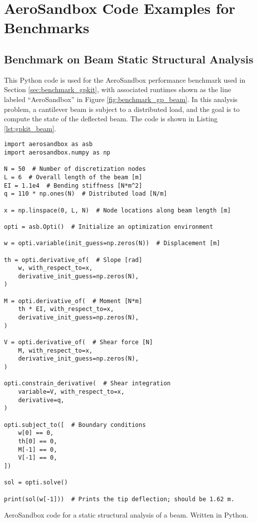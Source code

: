\chapter{AeroSandbox Code Examples for Benchmarks}
\label{chap:code}


\section{Benchmark on Beam Static Structural Analysis}

This Python code is used for the AeroSandbox performance benchmark used in Section \ref{sec:benchmark_gpkit}, with associated runtimes shown as the line labeled ``AeroSandbox'' in Figure \ref{fig:benchmark_gp_beam}. In this analysis problem, a cantilever beam is subject to a distributed load, and the goal is to compute the state of the deflected beam. The code is shown in Listing \ref{lst:gpkit_beam}.

\begin{listing}[h]
    \begin{verbatim}
import aerosandbox as asb
import aerosandbox.numpy as np

N = 50  # Number of discretization nodes
L = 6  # Overall length of the beam [m]
EI = 1.1e4  # Bending stiffness [N*m^2]
q = 110 * np.ones(N)  # Distributed load [N/m]

x = np.linspace(0, L, N)  # Node locations along beam length [m]

opti = asb.Opti()  # Initialize an optimization environment

w = opti.variable(init_guess=np.zeros(N))  # Displacement [m]

th = opti.derivative_of(  # Slope [rad]
    w, with_respect_to=x,
    derivative_init_guess=np.zeros(N),
)

M = opti.derivative_of(  # Moment [N*m]
    th * EI, with_respect_to=x,
    derivative_init_guess=np.zeros(N),
)

V = opti.derivative_of(  # Shear force [N]
    M, with_respect_to=x,
    derivative_init_guess=np.zeros(N),
)

opti.constrain_derivative(  # Shear integration
    variable=V, with_respect_to=x,
    derivative=q,
)

opti.subject_to([  # Boundary conditions
    w[0] == 0,
    th[0] == 0,
    M[-1] == 0,
    V[-1] == 0,
])

sol = opti.solve()

print(sol(w[-1]))  # Prints the tip deflection; should be 1.62 m.
    \end{verbatim}
    \caption{AeroSandbox code for a static structural analysis of a beam. Written in Python.}
    \label{lst:gpkit_beam}
\end{listing}
